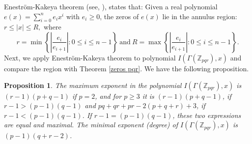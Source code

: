 \documentclass[12pt,twoside]{article}
\newtheorem{proposition}[theorem]{Proposition}
\begin{document}
Eneström-Kakeya theorem (see, \cite{barbeau}),  states that:  Given a real polynomial $e(x)=\sum_{i=0}^{n} e_{i}x^{i}$ with $e_{i}\geq 0$,  the zeros of $e(x)$ lie in the annulus region: $r\leq |x|\leq R,$
where 
$$r=\min \left \{\left|\frac{e_{i}}{e_{i+1}}\right| : 0\leq i\leq n-1  \right \} ~\text{and}~R=\max \left  \{\left|\frac{e_{i}}{e_{i+1}}\right| : 0\leq i\leq n-1  \right \}.$$ Next, we apply Eneström-Kakeya theorem to polynomial $I(\varGamma(\mathbb{Z}_{pqr}),x) $ and compare the region with Theorem \ref{zeros pqr}. We have the following proposition.
\begin{proposition}
	The maximum exponent in the polynomial $I(\varGamma(\mathbb{Z}_{pqr}),x)$ is $(r-1)(p+q-1)$ if $p=2$, and for $p \ge 3$ it is $(r-1)(p+q-1)$, if $r-1 > (p-1)(q-1)$ and $pq+qr+pr-2(p+q+r)+3$, if $r-1 < (p-1)(q-1)$. If $r-1=(p-1)(q-1)$, these two expressions are equal and maximal. The minimal exponent (degree) of $I(\varGamma(\mathbb{Z}_{pqr}),x)$ is $(p-1)(q+r-2)$.
\end{proposition}
\end{document}
